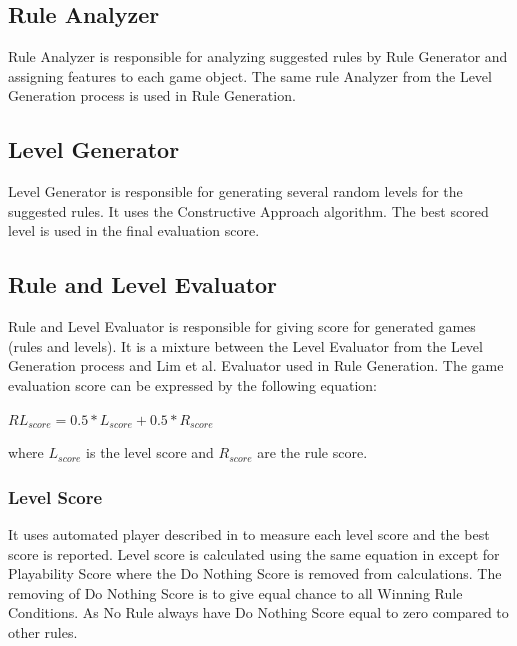 \subsection{Rule Analyzer}
Rule Analyzer is responsible for analyzing suggested rules by Rule Generator and assigning features to each game object. The same rule Analyzer from the Level Generation process is used in Rule Generation.

\subsection{Level Generator}
Level Generator is responsible for generating several random levels for the suggested rules. It uses the Constructive Approach algorithm. The best scored level is used in the final evaluation score.

\subsection{Rule and Level Evaluator}
Rule and Level Evaluator is responsible for giving score for generated games (rules and levels). It is a mixture between the Level Evaluator from the Level Generation process and Lim et al.\cite{puzzleScriptGeneration} Evaluator used in Rule Generation. The game evaluation score can be expressed by the following equation:
\begin{center}
$RL_{score} = 0.5 * L_{score} + 0.5 * R_{score}$
\end{center}
where $L_{score}$ is the level score and $R_{score}$ are the rule score.

\subsubsection{Level Score}
It uses automated player described in  to measure each level score and the best score is reported. Level score is calculated using the same equation in  except for Playability Score where the Do Nothing Score is removed from calculations. The removing of Do Nothing Score is to give equal chance to all Winning Rule Conditions. As No Rule always have Do Nothing Score equal to zero compared to other rules.

